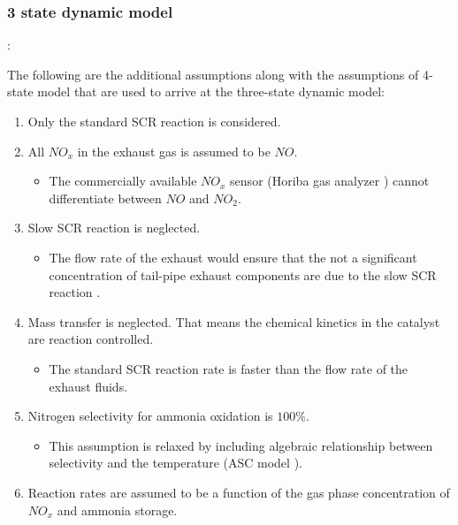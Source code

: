 \subsubsection{3 state dynamic model}
:

The following are the additional assumptions along with the assumptions of
4-state model that are used to arrive at the three-state dynamic model\cite{devarakonda2009model}:
\begin{enumerate}
    \item Only the standard SCR reaction is considered.
    \item All $NO_x$ in the exhaust gas is assumed to be $NO$.
    \begin{itemize}
        \item The commercially available $NO_x$ sensor (Horiba gas analyzer \cite{nova2014urea}) cannot differentiate between $NO$ and $NO_2$.
    \end{itemize}
    \item Slow SCR reaction is neglected.
    \begin{itemize}
        \item The flow rate of the exhaust would ensure that the not a significant concentration of tail-pipe exhaust components are due to the slow SCR reaction \cite{nova2014urea}.
    \end{itemize}
    \item Mass transfer is neglected. That means the chemical kinetics in the catalyst are reaction controlled.
    \begin{itemize}
        \item The standard SCR reaction rate is faster than the flow rate of the exhaust fluids.
    \end{itemize}
    \item Nitrogen selectivity for ammonia oxidation is $100\%$.
    \begin{itemize}
        \item This assumption is relaxed by including algebraic relationship between selectivity and the temperature (ASC model \cite{jain2023diagnostics}).
    \end{itemize}
    \item Reaction rates are assumed to be a function of the gas phase concentration of $NO_x$ and ammonia storage.
\end{enumerate}

\bigskip

